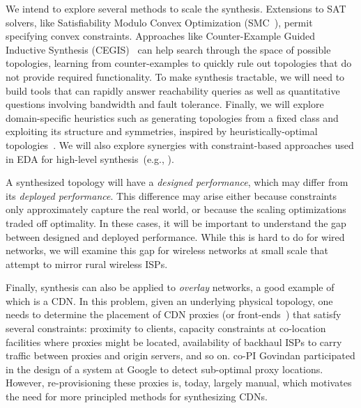 We intend to explore several methods to scale the synthesis. Extensions to SAT solvers, like Satisfiability Modulo Convex Optimization (SMC~\cite{satex}), permit specifying convex constraints. Approaches like Counter-Example Guided Inductive Synthesis (CEGIS)~\cite{sketch} can help search through the space of possible topologies, learning from counter-examples to quickly rule out topologies that do not provide required functionality. To make synthesis tractable, we will need to build tools that can rapidly answer reachability queries as well as quantitative questions involving bandwidth and fault tolerance. Finally, we will explore domain-specific heuristics such as generating topologies from a fixed class and exploiting its structure and symmetries, inspired by heuristically-optimal topologies~\cite{HOT}.  We will also explore synergies with constraint-based approaches used in EDA for high-level synthesis~(e.g., \cite{cong}).

A synthesized topology will have a \textit{designed performance}, which may differ from its \textit{deployed performance}. This difference may arise either because constraints only approximately capture the real world, or because the scaling optimizations traded off optimality. In these cases, it will be important to understand the gap between designed and deployed performance. While this is hard to do for wired networks, we will examine this gap for wireless networks at small scale that attempt to mirror rural wireless ISPs.

Finally, synthesis can also be applied to \textit{overlay} networks, a good example of which is a CDN. In this problem, given an underlying physical topology, one needs to determine the placement of CDN proxies (or front-ends~\cite{gentle-aggression,policing}) that satisfy several constraints: proximity to clients, capacity constraints at co-location facilities where proxies might be located, availability of backhaul ISPs to carry traffic between proxies and origin servers, and so on. co-PI Govindan participated in the design of a system at Google to detect sub-optimal proxy locations. However, re-provisioning these proxies is, today, largely manual, which motivates the need for more principled methods for synthesizing CDNs.



